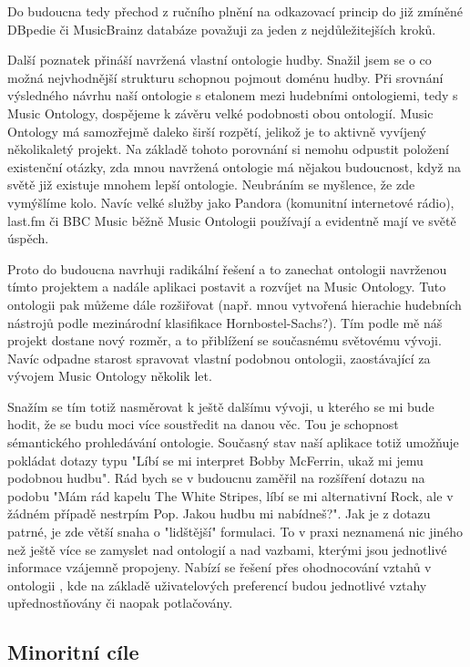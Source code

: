 Do budoucna tedy přechod z ručního plnění na odkazovací princip do již zmíněné DBpedie či MusicBrainz databáze považuji za jeden z nejdůležitejších kroků.		

\vspace*{24pt}

Další poznatek přináší navržená vlastní ontologie hudby. Snažil jsem se o co možná nejvhodnější strukturu schopnou pojmout doménu hudby.
Při srovnání výsledného návrhu naší ontologie s etalonem mezi hudebními ontologiemi, tedy s Music Ontology, dospějeme k závěru velké podobnosti obou ontologií. Music Ontology má samozřejmě daleko širší rozpětí, jelikož je to aktivně vyvíjený několikaletý projekt.
Na základě tohoto porovnání si nemohu odpustit položení existenční otázky, zda mnou navržená ontologie má nějakou budoucnost, když na světě již existuje mnohem lepší ontologie. Neubráním se myšlence, že zde vymýšlíme kolo. Navíc velké služby jako Pandora (komunitní internetové rádio), last.fm či BBC Music běžně Music Ontologii používají a evidentně mají ve světě úspěch.

Proto do budoucna navrhuji radikální řešení a to zanechat ontologii navrženou tímto projektem a nadále aplikaci postavit a rozvíjet na Music Ontology. Tuto ontologii pak můžeme dále rozšiřovat (např. mnou vytvořená hierachie hudebních nástrojů podle mezinárodní klasifikace Hornbostel-Sachs?).
Tím podle mě náš projekt dostane nový rozměr, a to přiblížení se současnému světovému vývoji. Navíc odpadne starost spravovat vlastní podobnou ontologii, zaostávající za vývojem Music Ontology několik let.

Snažím se tím totiž nasměrovat k ještě dalšímu vývoji, u kterého se mi bude hodit, že se budu moci více soustředit na danou věc. Tou je schopnost sémantického prohledávání ontologie.
Současný stav naší aplikace totiž umožňuje pokládat dotazy typu "Líbí se mi interpret Bobby McFerrin, ukaž mi jemu podobnou hudbu".
Rád bych se v budoucnu zaměřil na rozšíření dotazu na podobu "Mám rád kapelu The White Stripes, líbí se mi alternativní Rock, ale v žádném případě nestrpím Pop. Jakou hudbu mi nabídneš?". 
Jak je z dotazu patrné, je zde větší snaha o "lidštější" formulaci. To v praxi neznamená nic jiného než ještě více se zamyslet nad ontologií a nad vazbami, kterými jsou jednotlivé informace vzájemně propojeny.
Nabízí se řešení přes ohodnocování vztahů v ontologii \cite{kunc}, kde na základě uživatelových preferencí budou jednotlivé vztahy upřednostňovány či naopak potlačovány. 

\subsection{Minoritní cíle}

